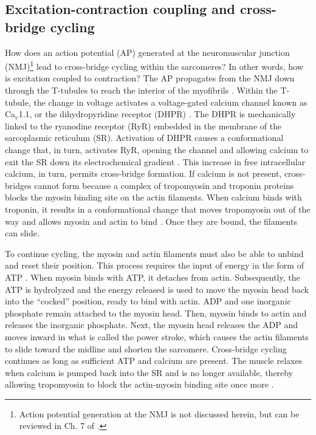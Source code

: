 \documentclass[12pt]{article}
\begin{document}
\subsection*{Excitation-contraction coupling and cross-bridge cycling}
How does an action potential (AP) generated at the neuromuscular junction (NMJ)\footnote{Action potential generation at the NMJ is not discussed herein, but can be reviewed in Ch. 7 of \cite{guyton2016book}.} lead to cross-bridge cycling within the sarcomeres? In other words, how is excitation coupled to contraction? The AP propagates from the NMJ down through the T-tubules to reach the interior of the myofibrils \cite{openStax2016contraction}. Within the T-tubule, the change in voltage activates a voltage-gated calcium channel known as Ca$_{v}$1.1, or the dihydropyridine receptor (DHPR) \cite{schneider2012skeletal}. The DHPR is mechanically linked to the ryanodine receptor (RyR) embedded in the membrane of the sarcoplasmic reticulum (SR). Activation of DHPR causes a conformational change that, in turn, activates RyR, opening the channel and allowing calcium to exit the SR down its electrochemical gradient \cite{schneider2012skeletal}. This increase in free intracellular calcium, in turn, permits cross-bridge formation. If calcium is not present, cross-bridges cannot form because a complex of tropomyosin and troponin proteins blocks the myosin binding site on the actin filaments. When calcium binds with troponin, it results in a conformational change that moves tropomyosin out of the way and allows myosin and actin to bind \cite{openStax2016contraction}. Once they are bound, the filaments can slide.

To continue cycling, the myosin and actin filaments must also be able to unbind and reset their position. This process requires the input of energy in the form of ATP \cite{openStax2016contraction}. When myosin binds with ATP, it detaches from actin. Subsequently, the ATP is hydrolyzed and the energy released is used to move the myosin head back into the ``cocked'' position, ready to bind with actin. ADP and one inorganic phosphate remain attached to the myosin head. Then, myosin binds to actin and releases the inorganic phosphate. Next, the myosin head releases the ADP and moves inward in what is called the power stroke, which causes the actin filaments to slide toward the midline and shorten the sarcomere. Cross-bridge cycling continues as long as sufficient ATP and calcium are present. The muscle relaxes when calcium is pumped back into the SR and is no longer available, thereby allowing tropomyosin to block the actin-myosin binding site once more \cite{openStax2016contraction}.
\end{document}
